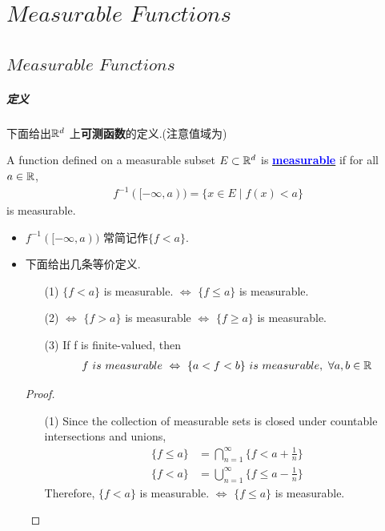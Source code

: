 \chapter{$Measurable \,\, Functions$}
\section{$Measurable \,\, Functions$}
\paragraph{定义}
	下面给出$\mathbb{R}^d$ 上\textbf{可测函数}的定义.(注意值域为)
	\begin{defn}\label{def 2.1.1}
		A function defined on a measurable subset $E \subset \mathbb{R}^d$ is \underline{\textcolor{blue}{\textbf{measurable}}} if for all $a \in \mathbb{R}$,
		\begin{align}
			f^{-1}([-\infty , a)) = \{ x \in E \mid f(x) < a \}
		\end{align}
		is measurable.
		
		\begin{rmk}
			\begin{itemize}
				\item $f^{-1}([-\infty , a))$ 常简记作$\{ f < a \}$.
				
				\item 下面给出几条等价定义.
				\begin{enumerate}
					\item[(1)]$\{ f < a \}$ is measurable. $\Leftrightarrow$ $\{ f \leq a \}$ is measurable.
					
					\item[(2)]$\Leftrightarrow$ $\{ f > a \}$ is measurable $\Leftrightarrow$ $\{ f \geq a \}$ is measurable.
					
					\item[(3)]If f is finite-valued, then
					\begin{align}
						f \,\, is \,\, measurable \,\, \Leftrightarrow \,\, \{ a < f < b \} \,\, is \,\, measurable, \,\, \forall a , b \in \mathbb{R}
					\end{align}
				\end{enumerate}
			
				\vspace{2em}
				\begin{proof}
					\begin{enumerate}
						\item[(1)]Since the collection of measurable sets is closed under countable intersections and unions,
						\begin{align}
							\{ f \leq a \} &= \bigcap_{n = 1}^{\infty}{\{ f < a + \frac{1}{n} \}} \\
							\{ f < a \} &= \bigcup_{n = 1}^{\infty}{\{ f \leq a - \frac{1}{n} \}}
						\end{align}
						Therefore, $\{ f < a \}$ is measurable. $\Leftrightarrow$ $\{ f \leq a \}$ is measurable.
						

\end{enumerate}
\end{proof}
\end{itemize}
\end{rmk}
\end{defn}
